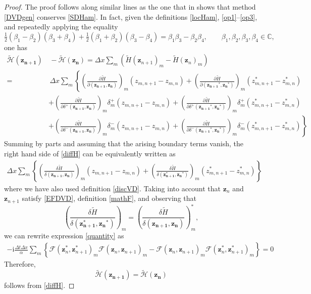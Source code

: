 \documentclass[twoside]{article}
\numberwithin{equation}{section}
\begin{document}
\begin{proof}
The proof follows along similar lines as the one that in \cite{Matsuo} shows that method \eqref{DVDgen} conserves \eqref{SDHam}. In fact,
given the definitions \eqref{locHam}, \eqref{op1}--\eqref{op3}, and repeatedly applying the equality $$\tfrac{1}2(\beta_1-\beta_2)(\beta_3+\beta_4)+\tfrac{1}2(\beta_1+\beta_2)(\beta_3-\beta_4)=\beta_1\beta_3-\beta_2\beta_4,\qquad \beta_1,\beta_2,\beta_3,\beta_4\in\mathbb{C},$$
one has
\begin{align}\label{diffH}
\widetilde{\mathcal H}(\mathbf{z_{n+1}})&\,-\widetilde{\mathcal H}(\mathbf{z_{n}})=\Delta x \sum_m (\widetilde H(\mathbf{z}_{n+1})_m-\widetilde H(\mathbf{z}_{n})_m)\\\nonumber
=&\,\Delta x\sum_m\!\left\{\!\left(\frac{\partial \widetilde{H}}{\partial(\mathbf{z_{n+1}},\mathbf{z_n})}\right)_{\!m}\!\!\!\!({z_{m,n+1}}-z_{m,n})\!+\!\left(\frac{\partial \widetilde{H}}{\partial(\mathbf{z_{n+1}}^*,\mathbf{z_n}^*)}\right)_{\!m}\!\!\!\!({z_{m,n+1}^*}-z_{m,n}^*)\right.\\\nonumber
&+\!\left(\frac{\partial \widetilde{H}}{\partial\delta^+(\mathbf{z_{n+1}},\mathbf{z_n})}\right)_{\!m}\!\!\!\!\delta^+_m({z_{m,n+1}}-z_{m,n})\!+\!\left(\frac{\partial \widetilde{H}}{\partial\delta^+(\mathbf{z_{n+1}}^*,\mathbf{z_n}^*)}\right)_{\!m}\!\!\!\!\delta^+_m({z_{m,n+1}^*}-z_{m,n}^*)\\\nonumber
&\left.+\!\left(\frac{\partial \widetilde{H}}{\partial\delta^-(\mathbf{z_{n+1}},\mathbf{z_n})}\right)_{\!m}\!\!\!\!\delta^-_m({z_{m,n+1}}-z_{m,n})\!+\!\left(\frac{\partial \widetilde{H}}{\partial\delta^-(\mathbf{z_{n+1}}^*,\mathbf{z_n}^*)}\right)_{\!m}\!\!\!\!\delta^-_m({z_{m,n+1}^*}-z_{m,n}^*)\right\}
\end{align}
Summing by parts and assuming that the arising boundary terms vanish, the right hand side of \eqref{diffH} can be equivalently written as
\begin{align}\label{quantity}
\Delta x\sum_m\left\{\left(\frac{\delta \widetilde{H}}{\delta(\mathbf{z_{n+1}},\mathbf{z_n})}\right)_m\!\!\!\! (z_{m,n+1}-z_{m,n})+\left(\frac{\delta \widetilde{H}}{\delta(\mathbf{z_{n+1}^*},\mathbf{z_n}^*)}\right)_m \!\!\!\!(z_{m,n+1}^*-z_{m,n}^*)\right\}
\end{align}
where we have also used definition \eqref{discVD}. Taking into account that $\mathbf{z}_n$ and  $\mathbf{z}_{n+1}$ satisfy \eqref{EFDVD}, definition \eqref{mathF}, 
and observing that 
$$\left(\frac{\delta \widetilde{H}}{\delta(\mathbf{z_{n+1}^*},\mathbf{z_n}^*)}\right)_m\!\!\!\!=\left(\frac{\delta \widetilde{H}}{\delta(\mathbf{z_{n+1}},\mathbf{z_n})}\right)_m^*, $$ 
we can rewrite expression \eqref{quantity} as
\begin{align}
-\mathrm{i}\frac{\Delta t\Delta x}{\alpha}\sum_m\left\{\mathcal{F}(\mathbf{z}_n^*,\mathbf{z}_{n+1}^*)_m\mathcal{F}(\mathbf{z}_n,\mathbf{z}_{n+1})_m-\mathcal{F}(\mathbf{z}_n,\mathbf{z}_{n+1})_m \mathcal{F}(\mathbf{z}^*_n,\mathbf{z}^*_{n+1})_m\right\}=0
\end{align}
Therefore, $$\widetilde{\mathcal{H}}(\mathbf{z_{n+1}})=\widetilde{\mathcal{H}}(\mathbf{z_{n}})$$
follows from \eqref{diffH}.
\end{proof}
\end{document}
